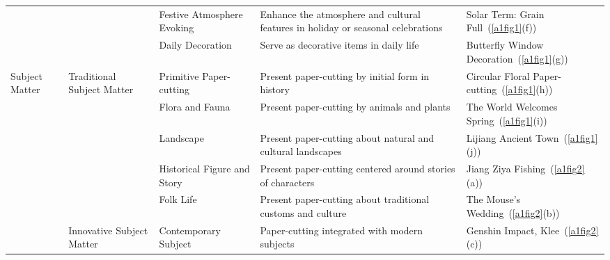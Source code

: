 \begin{table*}[!htbp]
{\begin{tabular}{l|l|l|p{}|l}
                                                                                &                                             & Festive Atmosphere Evoking        & Enhance the atmosphere and cultural features in holiday or seasonal celebrations  & Solar Term: Grain Full~(\autoref{a1fig1}(f))  \\ \cline{3-5} 
                                                                                &                                             & Daily Decoration                   & Serve as decorative items in daily life                                           & Butterfly Window Decoration~(\autoref{a1fig1}(g))  \\ \hline
\multirow{6}{*}{Subject Matter}                                                        & \multirow{5}{*}{Traditional Subject Matter}        & Primitive Paper-cutting            & Present paper-cutting by initial form in history                               & Circular Floral Paper-cutting~(\autoref{a1fig1}(h))  \\ \cline{3-5} 
                                                                                &                                             & Flora and Fauna                    & Present paper-cutting by animals and plants                                       & The World Welcomes Spring~(\autoref{a1fig1}(i))  \\ \cline{3-5} 
                                                                                &                                             & Landscape                         & Present paper-cutting about natural and cultural landscapes                       & Lijiang Ancient Town~(\autoref{a1fig1}(j))  \\ \cline{3-5} 
                                                                                &                                             & Historical Figure and Story                    & Present paper-cutting centered around stories of characters                       & Jiang Ziya Fishing~(\autoref{a1fig2}(a))  \\ \cline{3-5} 
                                                                                &                                             & Folk Life                & Present paper-cutting about traditional customs and culture                      & The Mouse's Wedding~(\autoref{a1fig2}(b))  \\ \cline{2-5} 
                                                                                & Innovative Subject Matter                         & Contemporary Subject               & Paper-cutting integrated with modern subjects                                     & Genshin Impact, Klee~(\autoref{a1fig2}(c))  \\ \hline

\end{tabular}}
\end{table*}
